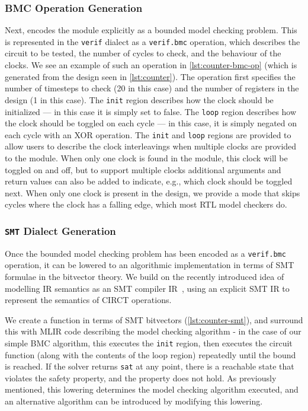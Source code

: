 \documentclass[acmsmall,screen,review]{acmart}
\begin{document}
\subsubsection{BMC Operation Generation}
Next, \toolname{} encodes the module explicitly as a bounded model checking problem.
This is represented in the \texttt{verif} dialect as a \texttt{verif.bmc} operation, which describes the circuit to be tested, the number of cycles to check, and the behaviour of the clocks.
We see an example of such an operation in \autoref{lst:counter-bmc-op} (which is generated from the design seen in \autoref{lst:counter}).
The operation first specifies the number of timesteps to check (20 in this case) and the number of registers in the design (1 in this case).
The \texttt{init} region describes how the clock should be initialized --- in this case it is simply set to false.
The \texttt{loop} region describes how the clock should be toggled on each cycle --- in this case, it is simply negated on each cycle with an XOR operation.
The \texttt{init} and \texttt{loop} regions are provided to allow users to describe the clock interleavings when multiple clocks are provided to the module.
When only one clock is found in the module, this clock will be toggled on and off, but to support multiple clocks additional arguments and return values can also be added to indicate, e.g., which clock should be toggled next.
When only one clock is present in the design, we provide a mode that skips cycles where the clock has a falling edge, which most RTL model checkers do.

\subsubsection{\texttt{SMT} Dialect Generation}

Once the bounded model checking problem has been encoded as a \texttt{verif.bmc} operation, it can be lowered to an algorithmic implementation in terms of SMT formulae in the bitvector theory.
We build on the recently introduced idea of modelling IR semantics as an SMT compiler
IR~\cite{mathieu_talk}, using an explicit SMT IR to represent the semantics of CIRCT operations.

We create a function in terms of SMT bitvectors (\autoref{lst:counter-smt}), and surround this with MLIR code describing the model checking algorithm - in the case of our simple BMC algorithm, this executes the \texttt{init} region, then executes the circuit function (along with the contents of the loop region) repeatedly until the bound is reached.
If the solver returns \texttt{sat} at any point, there is a reachable state that violates the safety property, and the property does not hold.
As previously mentioned, this lowering determines the model checking algorithm executed, and an alternative algorithm can be introduced by modifying this lowering.
\end{document}
